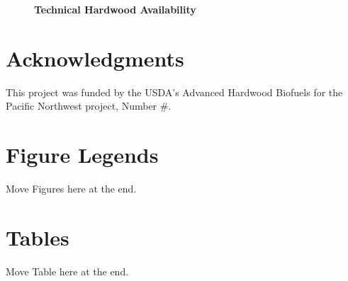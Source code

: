 \documentclass[10pt]{article}
\begin{document}
\begin{figure}[!ht]
\begin{center}
\end{center}
\caption{ {\bf Technical Hardwood Availability}  }
\label{fig:tech-map}
\end{figure}



\section*{Acknowledgments}
This project was funded by the USDA's Advanced Hardwood Biofuels for
the Pacific Northwest project, Number \#.



\section*{Figure Legends}

Move Figures here at the end.

\section*{Tables}

Move Table here at the end.

\end{document}
